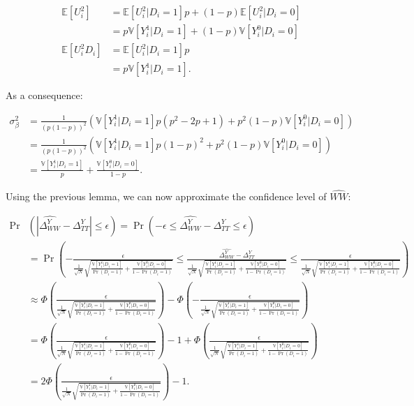 \documentclass[]{book}
\newcommand{\esp}[1]{\mathbb{E}[ #1 ]}
\newcommand{\var}[1]{\mathbb{V}[ #1 ]}
\theoremstyle{definition}
\theoremstyle{definition}
\theoremstyle{definition}
\theoremstyle{remark}
\begin{document}
\begin{align*}
\esp{U_i^2} & = \esp{U_i^2|D_i=1}p + (1-p)\esp{U_i^2|D_i=0}\\
            & = p\var{Y_i^1|D_i=1}+(1-p)\var{Y_i^0|D_i=0} \\
\esp{U_i^2D_i}  & = \esp{U_i^2|D_i=1}p  \\
                & = p\var{Y_i^1|D_i=1}.
 \end{align*}

As a consequence:

\begin{align*}
\sigma^2_{\beta} &= \frac{1}{(p(1-p))^2}\left(\var{Y_i^1|D_i=1}p(p^2-2p+1) + p^2(1-p)\var{Y_i^0|D_i=0}\right) \\
                  &= \frac{1}{(p(1-p))^2}\left(\var{Y_i^1|D_i=1}p(1-p)^2 + p^2(1-p)\var{Y_i^0|D_i=0}\right)\\
                  & = \frac{\var{Y_i^1|D_i=1}}{p}+\frac{\var{Y_i^0|D_i=0}}{1-p}.
 \end{align*}

Using the previous lemma, we can now approximate the confidence level of \(\hat{WW}\):

\begin{align*}
\Pr&(|\hat{\Delta^Y_{WW}}-\Delta^Y_{TT}|\leq\epsilon) = \Pr(-\epsilon\leq\hat{\Delta^Y_{WW}}-\Delta^Y_{TT}\leq\epsilon) \\
& = \Pr\left(-\frac{\epsilon}{\frac{1}{\sqrt{N}}\sqrt{\frac{\var{Y_i^1|D_i=1}}{\Pr(D_i=1)}+\frac{\var{Y_i^0|D_i=0}}{1-\Pr(D_i=1)}}}\leq\frac{\hat{\Delta^Y_{WW}}-\Delta^Y_{TT}}{\frac{1}{\sqrt{N}}\sqrt{\frac{\var{Y_i^1|D_i=1}}{\Pr(D_i=1)}+\frac{\var{Y_i^0|D_i=0}}{1-\Pr(D_i=1)}}}\leq\frac{\epsilon}{\frac{1}{\sqrt{N}}\sqrt{\frac{\var{Y_i^1|D_i=1}}{\Pr(D_i=1)}+\frac{\var{Y_i^0|D_i=0}}{1-\Pr(D_i=1)}}}\right)\\
& \approx \Phi\left(\frac{\epsilon}{\frac{1}{\sqrt{N}}\sqrt{\frac{\var{Y_i^1|D_i=1}}{\Pr(D_i=1)}+\frac{\var{Y_i^0|D_i=0}}{1-\Pr(D_i=1)}}}\right)-
\Phi\left(-\frac{\epsilon}{\frac{1}{\sqrt{N}}\sqrt{\frac{\var{Y_i^1|D_i=1}}{\Pr(D_i=1)}+\frac{\var{Y_i^0|D_i=0}}{1-\Pr(D_i=1)}}}\right)\\
& = \Phi\left(\frac{\epsilon}{\frac{1}{\sqrt{N}}\sqrt{\frac{\var{Y_i^1|D_i=1}}{\Pr(D_i=1)}+\frac{\var{Y_i^0|D_i=0}}{1-\Pr(D_i=1)}}}\right)- 1 + \Phi\left(\frac{\epsilon}{\frac{1}{\sqrt{N}}\sqrt{\frac{\var{Y_i^1|D_i=1}}{\Pr(D_i=1)}+\frac{\var{Y_i^0|D_i=0}}{1-\Pr(D_i=1)}}}\right)\\
& = 2\Phi\left(\frac{\epsilon}{\frac{1}{\sqrt{N}}\sqrt{\frac{\var{Y_i^1|D_i=1}}{\Pr(D_i=1)}+\frac{\var{Y_i^0|D_i=0}}{1-\Pr(D_i=1)}}}\right)-1.
\end{align*}
\end{document}
